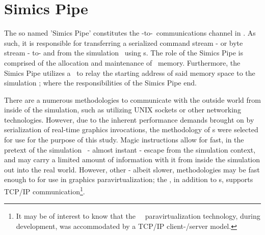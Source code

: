 \section{Simics Pipe}
\label{sec:proposedsolutionandimplementation_simicspipe}
The so named 'Simics Pipe' constitutes the \dvttermtarget -to-\dvttermhost\ communications channel in \dvttermsimics .
As such, it is responsible for transferring a serialized command stream - or byte stream - to- and from the simulation \dvttermhost\ using \dvttermmagicinstruction s.
The role of the Simics Pipe is comprised of the allocation and maintenance of  \dvttermtarget\ memory.
Furthermore, the Simics Pipe utilizes a \dvttermmagicinstruction\ to relay the starting address of said memory space to the simulation \dvttermhost ; where the responsibilities of the Simics Pipe end.

There are a numerous methodologies to communicate with the outside world from inside of the simulation, such as utilizing UNIX sockets or other networking technologies.
However, due to the inherent performance demands brought on by serialization of real-time graphics invocations, the methodology of \dvttermmagicinstruction s were selected for use for the purpose of this study.
Magic instructions allow for fast, in the pretext of the simulation \dvttermtarget\ - almost instant - escape from the simulation context, and may carry a limited amount of information with it from inside the simulation out into the real world.
However, other - albeit slower, methodologies may be fast enough to for use in graphics paravirtualization; the \dvttermandroidemulator , in addition to \dvttermmagicinstruction s, supports TCP/IP communication\footnote{It may be of interest to know that the \dvttermsimics\ \dvttermopengles\ paravirtualization technology, during development, was accommodated by a TCP/IP client-/server model.}.

